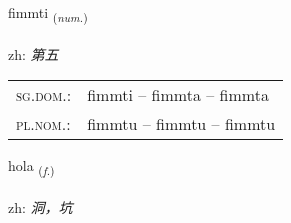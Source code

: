 \documentclass[frontgrid, backgrid]{flacards}\usepackage[]{graphicx}\usepackage[]{color}
\begin{document}
\renewcommand{\flhead}{\vskip5pt \fboxsep=0pt {\small\bfseries\footnotesize Töluorð | 数量词}}
\renewcommand{\fcfoot}{\vskip5pt \fboxsep=0pt \hspace{2pt}{\small\bfseries\footnotesize 2K}}

\renewcommand{\blhead}{\vskip5pt {\small\bfseries\footnotesize Töluorð | 数量词 }}
\renewcommand{\bcfoot}{\vskip5pt \hspace{2pt}{\small\bfseries\footnotesize 2K}}


{fimmti \small{\textsubscript{(\textit{num.})}} \\[1ex] %
\textphonetic{[fɪm̥tɪ]} \\
zh: \emph{第五} \\  [2ex]
\renewcommand*{\arraystretch}{0.8}
\begin{tabular}{ll}
\textsc{sg.dom.}: & fimmti  --  fimmta -- fimmta \\ 
\textsc{pl.nom.}: & fimmtu -- fimmtu -- fimmtu
\end{tabular}
}

\renewcommand{\flhead}{\vskip5pt \fboxsep=0pt {\small\bfseries\footnotesize Nafnorð | 名词}}
\renewcommand{\fcfoot}{\vskip5pt \fboxsep=0pt \hspace{2pt}{\small\bfseries\footnotesize 2K}}

\renewcommand{\blhead}{\vskip5pt {\small\bfseries\footnotesize Nafnorð | 名词 }}
\renewcommand{\bcfoot}{\vskip5pt \hspace{2pt}{\small\bfseries\footnotesize 2K}}


{hola \small{\textsubscript{(\textit{f.})}} \\[1ex] %
\textphonetic{[hɔːla]} \\
zh: \emph{洞，坑} \\  [2ex]
\renewcommand*{\arraystretch}{0.8}
}
\end{document}
